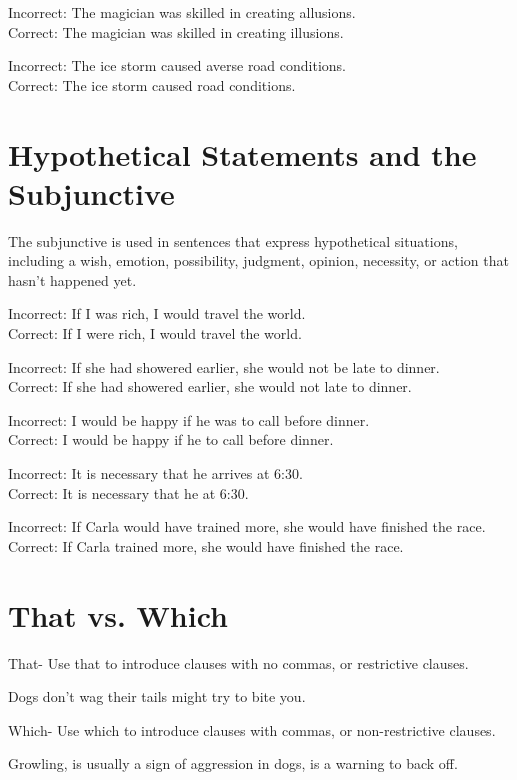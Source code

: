 \bigskip
Incorrect:  The magician was skilled in creating allusions.\\
Correct:  The magician was skilled in creating illusions.

\bigskip
Incorrect:  The ice storm caused averse road conditions.\\
Correct:  The ice storm caused \longline road conditions.

\section{Hypothetical Statements and the Subjunctive}
The subjunctive is used in sentences that express hypothetical situations, including a wish, emotion, possibility, judgment, opinion, necessity, or action that hasn't happened yet.

\bigskip
Incorrect:  If I was rich, I would travel the world.\\
Correct:  If I were rich, I would travel the world.

\bigskip
Incorrect: If she had showered earlier, she would not be late to dinner.\\
Correct:  If she had showered earlier, she would not \longline late to dinner.

\bigskip
Incorrect:  I would be happy if he was to call before dinner.\\
Correct:  I would be happy if he \longline to call before dinner.

\bigskip
Incorrect:  It is necessary that he arrives at 6:30.\\
Correct:  It is necessary that he \longline at 6:30.

\bigskip
Incorrect:  If Carla would have trained more, she would have finished the race.\\
Correct:  If Carla \longline trained more, she would have finished the race.

\section{That vs. Which}
That- Use that to introduce clauses with no commas, or restrictive clauses.

\bigskip
Dogs \longline don't wag their tails might try to bite you.

\bigskip
Which- Use which to introduce clauses with commas, or non-restrictive clauses.

\bigskip
Growling, \longline is usually a sign of aggression in dogs, is a warning to back off.

